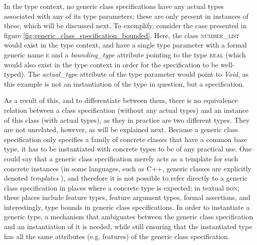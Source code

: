 In the type context, no generic class specifications have any actual types associated with any of its type parameters; these are only present in instances of these, which will be discussed next. To exemplify, consider the case presented in figure \ref{fig:generic_class_specification_bounded}. Here, the class \textsc{number\_list} would exist in the type context, and have a single type parameter with a formal generic name \textsc{e} and a \textit{bounding\_type} attribute pointing to the type \textsc{real} (which would also exist in the type context in order for the specification to be well-typed). The \textit{actual\_type} attribute of the type parameter would point to \textit{Void}, as this example is not an instantiation of the type in question, but a specification.

As a result of this, and to differentiate between them, there is no equivalence relation between a class specification (without any actual types) and an instance of this class (with actual types), as they in practice are two different types. They are not unrelated, however, as will be explained next.
Because a generic class specification only specifies a family of concrete classes that have a common base type,  it has to be instantiated with concrete types to be of any practical use.  One could say that a generic class specification merely acts as a template for such concrete instances (in some languages, such as C++, generic classes are explicitly denoted \textit{templates} \cite{stroustrup1997}), and therefore it is not possible to refer directly to a generic class specification in places where a concrete type is expected; in textual \textsc{bon}, these places include feature types, feature argument types, formal assertions, and interestingly, type bounds in generic class specifications. In order to instantiate a generic type, a mechanism that ambiguates between the generic class specification and an instantiation of it is needed, while still ensuring that the instantiated type has all the same attributes (e.g. features) of the generic class specification.
